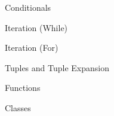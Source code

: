 \documentclass[aspectratio=169,xcolor=dvipsnames]{beamer}
\begin{document}
\begin{frame}{Conditionals}
  \begin{example}
    
  \end{example}
\end{frame}


\begin{frame}{Iteration (While)}
  \begin{example}
    
  \end{example}
\end{frame}


\begin{frame}{Iteration (For)}
  \begin{example}
    
  \end{example}
\end{frame}


\begin{frame}{Tuples and Tuple Expansion}
  \begin{example}
    
  \end{example}
\end{frame}


\begin{frame}{Functions}
  \begin{example}
    
  \end{example}
\end{frame}


\begin{frame}{Classes}
  \begin{example}
    
  \end{example}
\end{frame}

\end{document}
